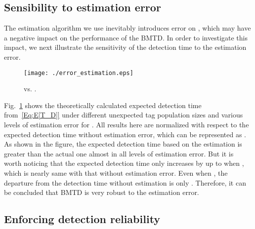 \documentclass[10pt, twocolumn]{IEEEtran}
\begin{document}
\subsection{Sensibility to estimation error}

The estimation algorithm we use inevitably introduces error on , which may have a negative impact on the performance of the BMTD. In order to investigate this impact, we next illustrate the sensitivity of the detection time to the estimation error.

\begin{figure}[htbp]
\centering
\centering
\texttt{[image: ./error\_estimation.eps]}
\caption{ vs. .}
\label{Fig:error_estimation}
\end{figure}
\begin{comment}
\begin{figure}[htbp]
\centering
\begin{minipage}[t]{0.49\linewidth}
\centering
\texttt{[image: ./error\_estimation.eps]}
\caption{ vs. .}
\label{Fig:error_estimation}
\end{minipage}
\begin{minipage}[t]{0.49\linewidth}
\centering
\texttt{[image: ./P\_D\_SRC.eps]}
\caption{ vs. .}
\label{Fig:SRC}
\end{minipage}
\end{figure}
\end{comment}

Fig.~\ref{Fig:error_estimation} shows the theoretically calculated expected detection time from~\eqref{Eq:E[T_D]} under different unexpected tag population sizes and various levels of estimation error for . All results here are normalized with respect to the expected detection time without estimation error, which can be represented as . As shown in the figure, the expected detection time based on the estimation is greater than the actual one  almost in all levels of estimation error. But it is worth noticing that the expected detection time only increases by up to  when , which is nearly same with that without estimation error. Even when , the departure from the detection time without estimation is only . Therefore, it can be concluded that BMTD is very robust to the estimation error.

\subsection{Enforcing detection reliability}
\end{document}
